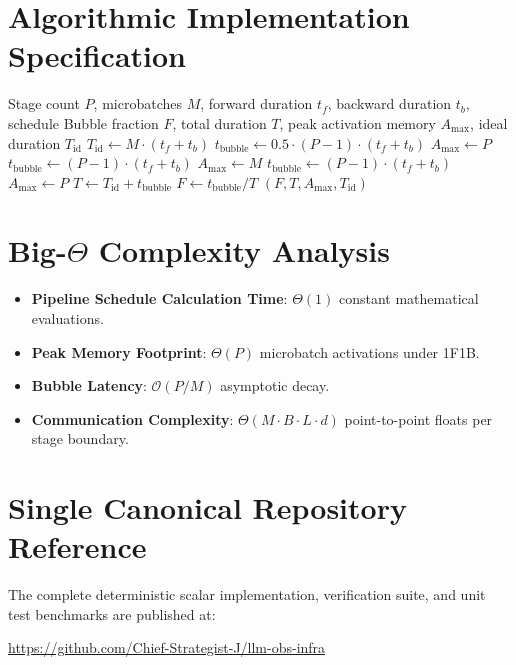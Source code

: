 \documentclass[11pt,a4paper]{article}
\theoremstyle{definition}
\begin{document}
\section{Algorithmic Implementation Specification}

\begin{algorithm}[H]
\caption{1F1B Pipeline Bubble and Memory Evaluation}
\begin{algorithmic}[1]
\Require Stage count $P$, microbatches $M$, forward duration $t_f$, backward duration $t_b$, schedule
\Ensure Bubble fraction $F$, total duration $T$, peak activation memory $A_{\max}$, ideal duration $T_{\text{id}}$
\State $T_{\text{id}} \gets M \cdot (t_f + t_b)$
    \State $t_{\text{bubble}} \gets 0.5 \cdot (P - 1) \cdot (t_f + t_b)$
    \State $A_{\max} \gets P$
    \State $t_{\text{bubble}} \gets (P - 1) \cdot (t_f + t_b)$
    \State $A_{\max} \gets M$
\Else
    \State $t_{\text{bubble}} \gets (P - 1) \cdot (t_f + t_b)$
    \State $A_{\max} \gets P$
\EndIf
\State $T \gets T_{\text{id}} + t_{\text{bubble}}$
\State $F \gets t_{\text{bubble}} / T$
\State \Return $(F, T, A_{\max}, T_{\text{id}})$
\end{algorithmic}
\end{algorithm}

\section{Big-$\Theta$ Complexity Analysis}

\begin{itemize}
    \item \textbf{Pipeline Schedule Calculation Time}: $\Theta(1)$ constant mathematical evaluations.
    \item \textbf{Peak Memory Footprint}: $\Theta(P)$ microbatch activations under 1F1B.
    \item \textbf{Bubble Latency}: $\mathcal{O}(P / M)$ asymptotic decay.
    \item \textbf{Communication Complexity}: $\Theta(M \cdot B \cdot L \cdot d)$ point-to-point floats per stage boundary.
\end{itemize}

\section{Single Canonical Repository Reference}

The complete deterministic scalar implementation, verification suite, and unit test benchmarks are published at:
\begin{center}
\url{https://github.com/Chief-Strategist-J/llm-obs-infra}
\end{center}
\end{document}
